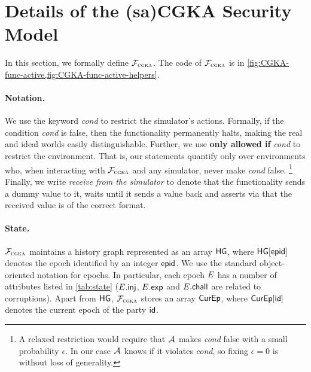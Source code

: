 
\section{Details of the (sa)CGKA Security Model}\label{sec:model}
In this section, we formally define $\mathcal{F}_{\normalfont\textsc{cgka}}$. The code of $\mathcal{F}_{\normalfont\textsc{cgka}}$ is in \cref{fig:CGKA-func-active,fig:CGKA-func-active-helpers}.

%
\paragraph{Notation.}
We use the keyword \KwAss{} \textit{cond} to restrict the simulator's actions. Formally, if the condition \textit{cond} is false, then the functionality permanently halts, making the real and ideal worlds easily distinguishable. Further, we use {\bf only allowed if} \textit{cond} to restrict the environment. That is, our statements quantify only over environments who, when interacting with $\mathcal{F}_{\normalfont\textsc{cgka}}$ and any simulator, never make \textit{cond} false.
  \footnote{A relaxed restriction would require that $\mathcal{A}_{\relax}$ makes \textit{cond} false with a small probability $\epsilon$. In our case $\mathcal{A}_{\relax}$ knows if it violates \textit{cond}, so fixing $\epsilon=0$ is without loss of generality.}
Finally, we write \emph{receive from the simulator} to denote that the functionality sends a dummy value to it, waits until it sends a value back and asserts via \KwAss{} that the received value is of the correct format.

\paragraph{State.}
$\mathcal{F}_{\normalfont\textsc{cgka}}$ maintains a history graph represented as an array $\mathsf{HG}$, where $\mathsf{HG}[{\normalfont\textsf{epid}}]$ denotes the epoch identified by an integer ${\normalfont\textsf{epid}}$. We use the standard object-oriented notation for epochs. In particular, each epoch $E$ has a number of attributes listed in \cref{tab:state} ($E.\textsf{inj}$, $E.\mathsf{exp}$ and $E.\mathsf{chall}$ are related to corruptions).
 Apart from $\mathsf{HG}$, $\mathcal{F}_{\normalfont\textsc{cgka}}$ stores an array $\textsf{CurEp}$, where $\textsf{CurEp}[{\mathsf{id}}]$ denotes the current epoch of the party ${\mathsf{id}}$.

